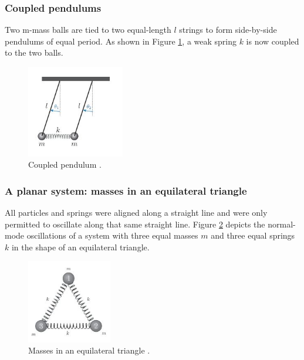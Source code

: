 \subsubsection{Coupled pendulums}

Two m-mass balls are tied to two equal-length $l$ strings to form side-by-side pendulums of equal period. As shown in Figure \ref{fig:2}, a weak spring $k$ is now coupled to the two balls. 

 \begin{figure}[hbt!]
	\centering
	\begin{framed}
	\includegraphics[width=0.38\textwidth]{Figures/B.JPG}
		\end{framed}
	\caption{Coupled pendulum \cite{Departme83:online}.}
	\label{fig:2}
\end{figure}

\subsubsection{ A planar system: masses in an equilateral triangle}

All particles and springs were aligned along a straight line and were only permitted to oscillate along that same straight line. Figure \ref{fig:3} depicts the normal-mode oscillations of a system with three equal masses $m$ and three equal springs $k$ in the shape of an equilateral triangle.

 \begin{figure}[hbt!]
	\centering
	\begin{framed}
	\includegraphics[width=0.33\textwidth]{Figures/C.JPG}
	\end{framed}
	\caption{Masses in an equilateral triangle
 \cite{Departme83:online}.}
	\label{fig:3}
\end{figure}

